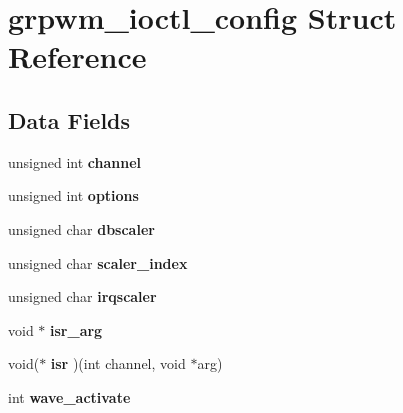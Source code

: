 \hypertarget{structgrpwm__ioctl__config}{}\section{grpwm\+\_\+ioctl\+\_\+config Struct Reference}
\label{structgrpwm__ioctl__config}
\subsection*{Data Fields}
\begin{DoxyCompactItemize}
\item 
\mbox{\label{structgrpwm__ioctl__config_ab6a41d9d2735f592ad8903c8eeafd0d6}} 
unsigned int {\bfseries channel}
\item 
\mbox{\label{structgrpwm__ioctl__config_a009ba837ac891da1d0b63936262b8582}} 
unsigned int {\bfseries options}
\item 
\mbox{\label{structgrpwm__ioctl__config_a43c69977fcf61e5566c1f361c0a0492a}} 
unsigned char {\bfseries dbscaler}
\item 
\mbox{\label{structgrpwm__ioctl__config_ab46bd4d8298ff197ec792365d937fd27}} 
unsigned char {\bfseries scaler\+\_\+index}
\item 
\mbox{\label{structgrpwm__ioctl__config_a3d6d72996904320df4636db8e1e17910}} 
unsigned char {\bfseries irqscaler}
\item 
\mbox{\label{structgrpwm__ioctl__config_ad2450569d3ba88597e3c0bbe31c1e785}} 
void $\ast$ {\bfseries isr\+\_\+arg}
\item 
\mbox{\label{structgrpwm__ioctl__config_a64a4b78088f9e679561c6ebb51abb86e}} 
void($\ast$ {\bfseries isr} )(int channel, void $\ast$arg)
\item 
\mbox{\label{structgrpwm__ioctl__config_a1e7cdc965db417b26a3635d97e6707f9}} 
int {\bfseries wave\+\_\+activate}
\item 
\mbox{\label{structgrpwm__ioctl__config_a8c8ec68770cd0e4ffe9485ea16e53a30}} 

\end{DoxyCompactItemize}
